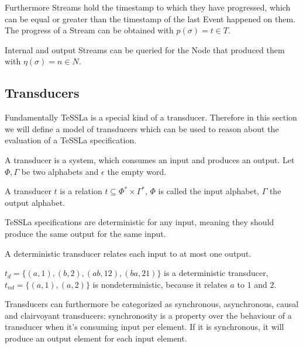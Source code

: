 Furthermore Streams hold the timestamp to which they have progressed, which can be equal or greater than the timestamp of the last Event happened on them.
The progress of a Stream can be obtained with \(p(\sigma) = t \in T\).

Internal and output Streams can be queried for the Node that produced them with \(\eta(\sigma) = n \in N\).

\subsection{Transducers}
\label{sec:concepts:defs:transducers}

Fundamentally TeSSLa is a special kind of a transducer.
Therefore in this section we will define a model of transducers which can be used to reason about the evaluation of a TeSSLa specification.

A transducer is a system, which consumes an input and produces an output.
Let \(\Phi, \Gamma\) be two alphabets and \(\epsilon\) the empty word.

\begin{definition}[name = Transducer]\label{def:transducer}
  A transducer \(t\) is a relation \(t \subseteq \Phi^* \times \Gamma^*\), \(\Phi\) is called the input alphabet, \(\Gamma\) the output alphabet.
\end{definition}


TeSSLa specifications are deterministic for any input, meaning they should produce the same output for the same input.

\begin{definition}[name = Deterministic Transducer]\label{def:deterministic_transducer}
  A deterministic transducer relates each input to at most one output.
\end{definition}

\begin{exmp}[name = Deterministic and Nondeterministic Transducers]
  \(t_d = \{(a,1),(b,2),(ab,12),(ba,21)\}\) is a deterministic transducer, \(t_{nd} = \{(a,1),(a,2)\}\) is nondeterministic, because it relates \(a\) to \(1\) and \(2\).
\end{exmp}

Transducers can furthermore be categorized as synchronous, asynchronous, causal and clairvoyant transducers:
synchronosity is a property over the behaviour of a transducer when it's consuming input per element.
If it is synchronous, it will produce an output element for each input element.

